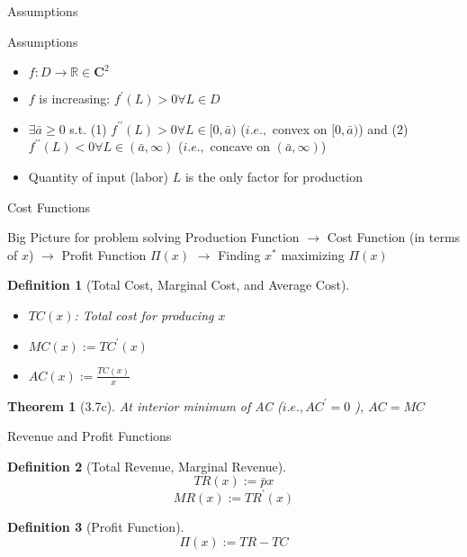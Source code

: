 \documentclass[a4paper,11pt]{article}
\newtheorem{defn}{Definition}
\newtheorem{thm}{Theorem}
\begin{document}
\begin{frame}[t]{Assumptions}
	\begin{block}
		{Assumptions}
		\begin{itemize}
			\item $f:D\rightarrow\mathbb{R}\in \mathbf{C}^2$
			\item $f$ is increasing: $f^\prime(L) >0 \forall L\in D$
			\item $\exists \bar a\ge 0$ s.t. (1) $f^{\prime\prime}(L)>0 \forall L\in[0,\bar a)$ ($i.e.,$ convex on $[0,\bar a)$) and (2) $f^{\prime\prime}(L)<0 \forall L\in(\bar a,\infty)$ ($i.e.,$ concave on $(\bar a,\infty)$)
			\item Quantity of input (labor) $L$ is the only factor for production
		\end{itemize}
	\end{block}

\end{frame}


\begin{frame}[t]{Cost Functions}
	\begin{block}
		{Big Picture for problem solving}
		Production Function $\rightarrow$ Cost Function (in terms of $x$) $\rightarrow$ Profit Function $\Pi(x)$ $\rightarrow$ Finding $x^\ast$ maximizing $\Pi(x)$
	\end{block}
	
	\begin{defn}
		[Total Cost, Marginal Cost, and Average Cost]
		\begin{itemize}
			\item $TC(x)$: Total cost for producing $x$
			\item $MC(x):= TC^\prime(x)$
			\item $AC(x):= \frac{TC(x)}{x}$
		\end{itemize}
	\end{defn}
	
	\begin{thm}
		[3.7c]
		At interior minimum of AC ($i.e.,AC^\prime=0$ ), $AC=MC$
	\end{thm}
\end{frame}

\begin{frame}[t]{Revenue and Profit Functions}
	\begin{defn}
		[Total Revenue, Marginal Revenue]
		\[
			TR(x) := \bar p x
		\]
		\[
			MR(x) := TR^\prime (x)
		\]
	\end{defn}
	\begin{defn}
		[Profit Function]
		\[
			\Pi(x) := TR-TC
		\]
	\end{defn}
\end{frame}
\end{document}
